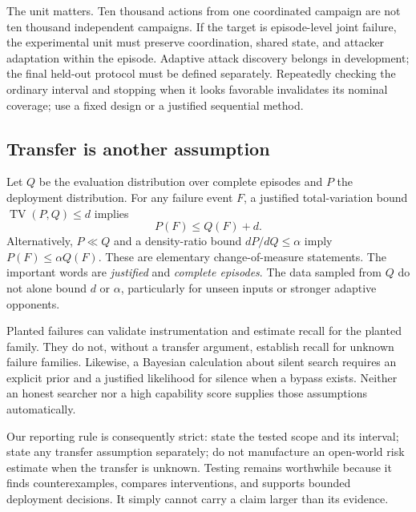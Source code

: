 The unit matters. Ten thousand actions from one coordinated campaign are not ten thousand independent campaigns. If the target is episode-level joint failure, the experimental unit must preserve coordination, shared state, and attacker adaptation within the episode. Adaptive attack discovery belongs in development; the final held-out protocol must be defined separately. Repeatedly checking the ordinary interval and stopping when it looks favorable invalidates its nominal coverage; use a fixed design or a justified sequential method.

\subsection{Transfer is another assumption}
Let $Q$ be the evaluation distribution over complete episodes and $P$ the deployment distribution. For any failure event $F$, a justified total-variation bound $\operatorname{TV}(P,Q)\le d$ implies
\[
P(F)\le Q(F)+d.
\]
Alternatively, $P\ll Q$ and a density-ratio bound $dP/dQ\le\alpha$ imply $P(F)\le\alpha Q(F)$. These are elementary change-of-measure statements. The important words are \emph{justified} and \emph{complete episodes}. The data sampled from $Q$ do not alone bound $d$ or $\alpha$, particularly for unseen inputs or stronger adaptive opponents.

Planted failures can validate instrumentation and estimate recall for the planted family. They do not, without a transfer argument, establish recall for unknown failure families. Likewise, a Bayesian calculation about silent search requires an explicit prior and a justified likelihood for silence when a bypass exists. Neither an honest searcher nor a high capability score supplies those assumptions automatically.

Our reporting rule is consequently strict: state the tested scope and its interval; state any transfer assumption separately; do not manufacture an open-world risk estimate when the transfer is unknown. Testing remains worthwhile because it finds counterexamples, compares interventions, and supports bounded deployment decisions. It simply cannot carry a claim larger than its evidence.
